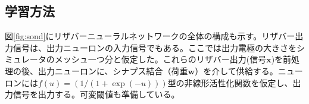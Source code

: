 \documentclass[a4j, twocolumn]{jsarticle}
\begin{document}
\subsection{学習方法}
\label{subsec:learning}

図\ref{fig:sond}にリザバーニューラルネットワークの全体の構成も示す。リザバー出力信号は、出力ニューロンの入力信号でもある。ここでは出力電極の大きさをシミュレータのメッシュ一つ分と仮定した。これらのリザバー出力(信号$\bm{x}$)を前処理の後、出力ニューロンに、シナプス結合（荷重$\bm{w}$）を介して供給する。ニューロンには$f ( u ) = (1/(1+\exp(-u)))$型の非線形活性化関数を仮定し、出力信号を出力する。可変閾値も準備している。
\end{document}
